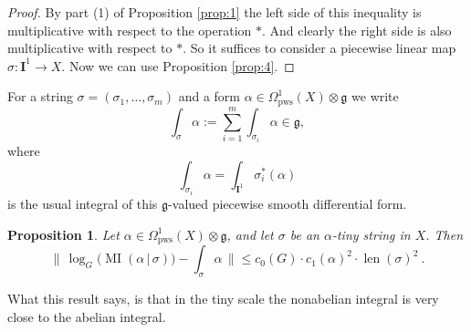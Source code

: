 \documentclass[10pt, a4paper]{amsart}
\newtheorem{prop}[equation]{Proposition}
\theoremstyle{definition}
\numberwithin{equation}{section}
\newcommand{\opn}{\operatorname}
\newcommand{\mfrak}[1]{\mathfrak{#1}}
\newcommand{\mbf}[1]{\mathbf{#1}}
\newcommand{\mrm}[1]{\mathrm{#1}}
\newcommand{\Norm}[1]{\bigl\lVert\, #1 \, \bigr\rVert}
\renewcommand{\vert}{\, | \,}
\newcommand{\g}{\mfrak{g}}
\begin{document}
\begin{proof}
By part (1) of Proposition \ref{prop:1} 
the left side of this inequality is multiplicative with respect
to the operation $*$. And clearly the right side is also multiplicative with
respect to $*$. So it suffices to consider a piecewise linear map 
$\sigma : \mbf{I}^{1} \to X$. Now we can use Proposition \ref{prop:4}.
\end{proof}

For a string $\sigma = (\sigma_1, \ldots, \sigma_m)$ 
and a form 
$\alpha \in \Omega_{\mrm{pws}}^1(X) \otimes \mfrak{g}$
we write
\[ \int_{\sigma} \alpha := \sum_{i = 1}^m \int_{\sigma_i} \alpha \in \g , \]
where 
\[ \int_{\sigma_i} \alpha = \int_{\mbf{I}^1} \sigma_i^*(\alpha) \] 
is the usual integral of this $\g$-valued piecewise smooth differential form. 

\begin{prop} \label{prop:16}
Let $\alpha \in \Omega^1_{\mrm{pws}}(X) \otimes \g$, and let $\sigma$ be an
$\alpha$-tiny string in $X$. Then 
\[ \Norm{ \log_G \bigl( \opn{MI}(\alpha \vert \sigma) \bigr) - 
\int_{\sigma} \alpha } \leq 
c_0(G) \cdot c_1(\alpha)^2 \cdot \opn{len}(\sigma)^2 \ . \]
\end{prop}

What this result says, is that in the tiny scale the nonabelian 
integral is very close to the abelian integral.
\end{document}
